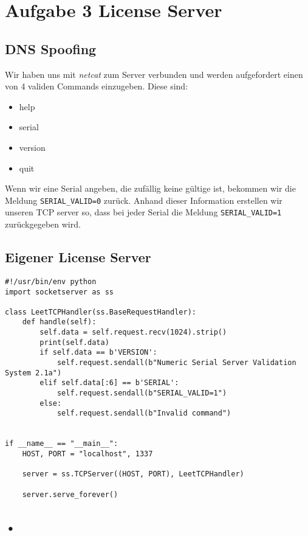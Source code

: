 \documentclass[10pt,a4paper]{article}
\begin{document}
\setcounter{section}{3}
\setcounter{subsection}{0}
\section*{Aufgabe 3 License Server}
\subsection{DNS Spoofing}
Wir haben uns mit \textit{netcat} zum Server verbunden und werden aufgefordert einen von 4 validen Commands einzugeben. Diese sind:
\begin{itemize}
\item help
\item serial
\item version
\item quit
\end{itemize}
Wenn wir eine Serial angeben, die zufällig keine gültige ist, bekommen wir die Meldung \texttt{SERIAL\_VALID=0} zurück. Anhand dieser Information erstellen wir unseren TCP server so, dass bei jeder Serial die Meldung \texttt{SERIAL\_VALID=1} zurückgegeben wird.
\subsection{Eigener License Server}
\begin{verbatim}
#!/usr/bin/env python
import socketserver as ss

class LeetTCPHandler(ss.BaseRequestHandler):
    def handle(self):
        self.data = self.request.recv(1024).strip()
        print(self.data)
        if self.data == b'VERSION':
            self.request.sendall(b"Numeric Serial Server Validation System 2.1a")
        elif self.data[:6] == b'SERIAL':
            self.request.sendall(b"SERIAL_VALID=1")
        else:
            self.request.sendall(b"Invalid command")


if __name__ == "__main__":
    HOST, PORT = "localhost", 1337

    server = ss.TCPServer((HOST, PORT), LeetTCPHandler)

    server.serve_forever()
\end{verbatim}

\subsection{•}
\end{document}
